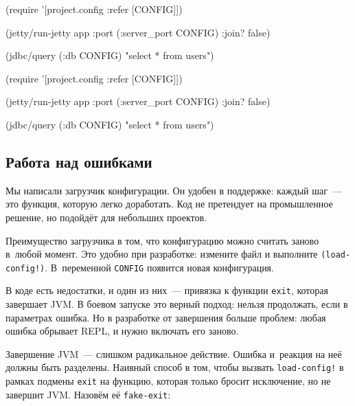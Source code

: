 \begin{english}
  \begin{clojure}
(require
  '[project.config :refer [CONFIG]])

(jetty/run-jetty app
  {:port (:server_port CONFIG)
   :join? false})

(jdbc/query (:db CONFIG)
  "select * from users")
  \end{clojure}
\end{english}

\else

\begin{english}
  \begin{clojure}
(require '[project.config :refer [CONFIG]])

(jetty/run-jetty app {:port (:server_port CONFIG)
                      :join? false})

(jdbc/query (:db CONFIG) "select * from users")
  \end{clojure}
\end{english}

\fi

\subsection{Работа над ошибками}

Мы написали загрузчик конфигурации. Он удобен в поддержке: каждый шаг~--- это
функция, которую легко доработать. Код не претендует на промышленное решение, но
подойдёт для небольших проектов.

Преимущество загрузчика в том, что конфигурацию можно считать заново в~любой
момент. Это удобно при разработке: измените файл и выполните
\verb|(load-config!)|. В~переменной \verb|CONFIG| появится новая конфигурация.


В коде есть недостатки, и один из них~--- привязка к функции \verb|exit|,
которая завершает JVM. В боевом запуске это верный подход: нельзя продолжать,
если в параметрах ошибка. Но в разработке от завершения больше проблем: любая
ошибка обрывает REPL, и нужно включать его заново.

Завершение JVM~--- слишком радикальное действие. Ошибка и~реакция на неё должны
быть разделены. Наивный способ в том, чтобы вызвать \verb|load-config!| в рамках
подмены \verb|exit| на функцию, которая только бросит исключение, но не завершит
JVM. Назовём её \verb|fake-exit|:






